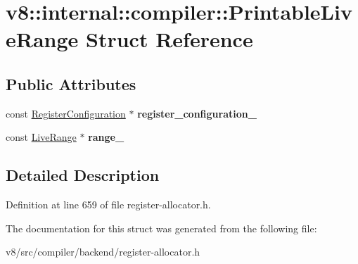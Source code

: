 \hypertarget{structv8_1_1internal_1_1compiler_1_1PrintableLiveRange}{}\section{v8\+:\+:internal\+:\+:compiler\+:\+:Printable\+Live\+Range Struct Reference}
\label{structv8_1_1internal_1_1compiler_1_1PrintableLiveRange}
\subsection*{Public Attributes}
\begin{DoxyCompactItemize}
\item 
\mbox{\label{structv8_1_1internal_1_1compiler_1_1PrintableLiveRange_aa79d6fdb18ee5834ecdee53a75cd7a94}} 
const \mbox{\hyperlink{classv8_1_1internal_1_1RegisterConfiguration}{Register\+Configuration}} $\ast$ {\bfseries register\+\_\+configuration\+\_\+}
\item 
\mbox{\label{structv8_1_1internal_1_1compiler_1_1PrintableLiveRange_a1b6c54bec4e26d51ff3c40bb1154c1b9}} 
const \mbox{\hyperlink{classv8_1_1internal_1_1compiler_1_1LiveRange}{Live\+Range}} $\ast$ {\bfseries range\+\_\+}
\end{DoxyCompactItemize}


\subsection{Detailed Description}


Definition at line 659 of file register-\/allocator.\+h.



The documentation for this struct was generated from the following file\+:\begin{DoxyCompactItemize}
\item 
v8/src/compiler/backend/register-\/allocator.\+h\end{DoxyCompactItemize}
